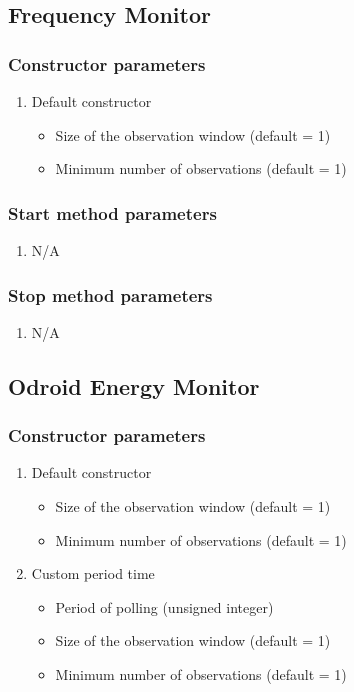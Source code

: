 \subsection{Frequency Monitor}

\subsubsection*{Constructor parameters}
\begin{enumerate}
	\item Default constructor
		\begin{itemize}
			\item Size of the observation window (default = 1)
			\item Minimum number of observations (default = 1)
		\end{itemize}
\end{enumerate}

\subsubsection*{Start method parameters}
\begin{enumerate}
	\item[] N/A
\end{enumerate}


\subsubsection*{Stop method parameters}
\begin{enumerate}
	\item[] N/A
\end{enumerate}




\subsection{Odroid Energy Monitor}

\subsubsection*{Constructor parameters}
\begin{enumerate}
	\item Default constructor
		\begin{itemize}
			\item Size of the observation window (default = 1)
			\item Minimum number of observations (default = 1)
		\end{itemize}
	\item Custom period time
		\begin{itemize}
			\item Period of polling (unsigned integer)
			\item Size of the observation window (default = 1)
			\item Minimum number of observations (default = 1)
		\end{itemize}
\end{enumerate}

